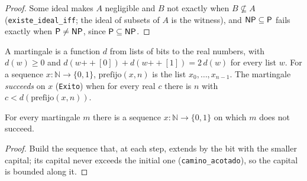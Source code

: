 \begin{proof}
  \leanok
  Some ideal makes $A$ negligible and $B$ not exactly when $B \not\subseteq A$ (\texttt{existe\_ideal\_iff};
  the ideal of subsets of $A$ is the witness), and $\mathsf{NP} \subseteq \mathsf{P}$ fails exactly when $\mathsf{P} \ne \mathsf{NP}$,
  since $\mathsf{P} \subseteq \mathsf{NP}$.
\end{proof}

\begin{definition}
  \label{def:scales-martingala}
  \leanok
  A martingale is a function $d$ from lists of bits to the real numbers, with $d(w) \ge 0$ and $d(w
  \mathbin{+\!\!+} [0]) + d(w \mathbin{+\!\!+} [1]) = 2\,d(w)$ for every list $w$. For a sequence $x :
  \mathbb{N} \to \{0,1\}$, $\mathrm{prefijo}(x,n)$ is the list $x_0,\dots,x_{n-1}$. The martingale
  \emph{succeeds} on $x$ (\texttt{Exito}) when for every real $c$ there is $n$ with $c <
  d(\mathrm{prefijo}(x,n))$.
  \own{}
\end{definition}

\begin{theorem}
  \label{thm:scales-una-martingala}
  \leanok
  For every martingale $m$ there is a sequence $x : \mathbb{N}\to\{0,1\}$ on which $m$ does not succeed.
  \own{}
\end{theorem}

\begin{proof}
  \leanok
  Build the sequence that, at each step, extends by the bit with the smaller capital; its capital never
  exceeds the initial one (\texttt{camino\_acotado}), so the capital is bounded along it.
\end{proof}
